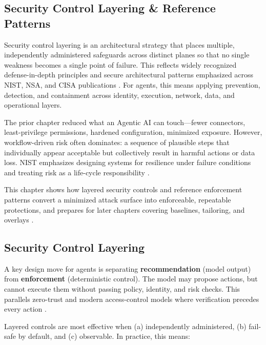 \begin{TNtwocol}
      \section{Security Control Layering \& Reference Patterns}

      Security control layering is an architectural strategy that places multiple, independently administered safeguards across distinct planes so that no single weakness becomes a single point of failure. This reflects widely recognized defense-in-depth principles and secure architectural patterns emphasized across NIST, NSA, and CISA publications \cite{NSA_Defense_In_Depth,CISA_DiD_2024,NIST_SP800_12R1}. For agents, this means applying prevention, detection, and containment across identity, execution, network, data, and operational layers.

      The prior chapter reduced what an Agentic AI can touch—fewer connectors, least-privilege permissions, hardened configuration, minimized exposure. However, workflow-driven risk often dominates: a sequence of plausible steps that individually appear acceptable but collectively result in harmful actions or data loss. NIST emphasizes designing systems for resilience under failure conditions and treating risk as a life-cycle responsibility \cite{NIST_AI_RMF_100_1,NIST_GenAI_Profile_600_1,ISO_23894_2023}.

      This chapter shows how layered security controls and reference enforcement patterns convert a minimized attack surface into enforceable, repeatable protections, and prepares for later chapters covering baselines, tailoring, and overlays \cite{NIST_SP800_218,NIST_SP800_50R1}.

      \subsection{Security Control Layering}

      A key design move for agents is separating \textbf{recommendation} (model output) from \textbf{enforcement} (deterministic control). The model may propose actions, but cannot execute them without passing policy, identity, and risk checks. This parallels zero-trust and modern access-control models where verification precedes every action \cite{NIST_SP800_207,NIST_SP800_207A,CISA_ZTMM_v2}.

      Layered controls are most effective when (a) independently administered, (b) fail-safe by default, and (c) observable. In practice, this means:


\end{TNtwocol}
